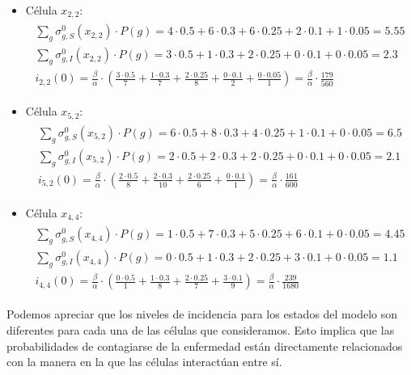 \begin{example}
\begin{itemize}
    \item Célula $x_{2,2}$:
    \begin{align*}
    \begin{array}{l}
        \sum_g\sigma_{g,S}^0(x_{2,2})\cdot P(g) = 4\cdot0.5+6\cdot0.3+6\cdot0.25+2\cdot0.1+1\cdot0.05 = 5.55 \\
        \sum_g\sigma_{g,I}^0(x_{2,2})\cdot P(g) = 3\cdot0.5+1\cdot0.3+2\cdot0.25+0\cdot0.1+0\cdot0.05 = 2.3\\
        i_{2,2}(0) = \frac{\beta}{\alpha}\cdot\left(\frac{3\cdot0.5}{7}+\frac{1\cdot0.3}{7}+\frac{2\cdot0.25}{8}+\frac{0\cdot0.1}{2}+\frac{0\cdot0.05}{1}\right)=\frac{\beta}{\alpha}\cdot\frac{179}{560}
    \end{array}
    \end{align*}
    \item Célula $x_{5,2}$:
    \begin{align*}
    \begin{array}{l}
        \sum_g\sigma_{g,S}^0(x_{5,2})\cdot P(g) = 6\cdot0.5+8\cdot0.3+4\cdot0.25+1\cdot0.1+0\cdot0.05 = 6.5 \\
        \sum_g\sigma_{g,I}^0(x_{5,2})\cdot P(g) = 2\cdot0.5+2\cdot0.3+2\cdot0.25+0\cdot0.1+0\cdot0.05 = 2.1\\
        i_{5,2}(0) = \frac{\beta}{\alpha}\cdot\left(\frac{2\cdot0.5}{8}+\frac{2\cdot0.3}{10}+\frac{2\cdot0.25}{6}+\frac{0\cdot0.1}{1}\right)=\frac{\beta}{\alpha}\cdot\frac{161}{600}
    \end{array}
    \end{align*}
    \item Célula $x_{4,4}$:
    \begin{align*}
    \begin{array}{l}
        \sum_g\sigma_{g,S}^0(x_{4,4})\cdot P(g) = 1\cdot0.5+7\cdot0.3+5\cdot0.25+6\cdot0.1+0\cdot0.05 = 4.45 \\
        \sum_g\sigma_{g,I}^0(x_{4,4})\cdot P(g) = 0\cdot0.5+1\cdot0.3+2\cdot0.25+3\cdot0.1+0\cdot0.05 = 1.1\\
        i_{4,4}(0) = \frac{\beta}{\alpha}\cdot\left(\frac{0\cdot0.5}{1}+\frac{1\cdot0.3}{8}+\frac{2\cdot0.25}{7}+\frac{3\cdot0.1}{9}\right)=\frac{\beta}{\alpha}\cdot\frac{239}{1680}
    \end{array}
    \end{align*}
\end{itemize}

Podemos apreciar que los niveles de incidencia para los estados del modelo son diferentes para cada una de las células que consideramos. Esto implica que las probabilidades de contagiarse de la enfermedad están directamente relacionados con la manera en la que las células interactúan entre sí.


\end{example}
